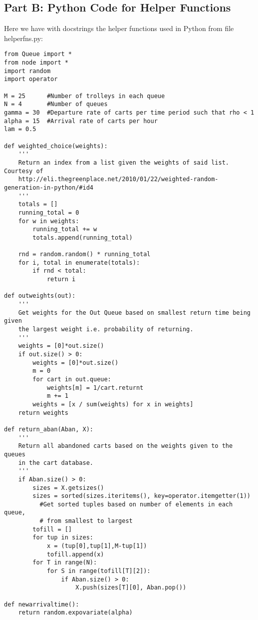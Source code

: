 \documentclass[english]{article}
\begin{document}
\subsection*{Part B: Python Code for Helper Functions}
Here we have with docstrings the helper functions used in Python from file helperfns.py:
\begin{singlespace}
\begin{verbatim}
from Queue import *
from node import *
import random
import operator

M = 25		#Number of trolleys in each queue
N = 4		#Number of queues
gamma = 30 	#Departure rate of carts per time period such that rho < 1
alpha = 15	#Arrival rate of carts per hour
lam = 0.5

def weighted_choice(weights): 
    '''
    Return an index from a list given the weights of said list. Courtesy of     
    http://eli.thegreenplace.net/2010/01/22/weighted-random-generation-in-python/#id4
    '''
    totals = []           
    running_total = 0
    for w in weights:
        running_total += w
        totals.append(running_total)

    rnd = random.random() * running_total
    for i, total in enumerate(totals):
        if rnd < total:
            return i

def outweights(out):
    '''
    Get weights for the Out Queue based on smallest return time being given
    the largest weight i.e. probability of returning.
    '''
    weights = [0]*out.size()
    if out.size() > 0:
        weights = [0]*out.size()
        m = 0
        for cart in out.queue:
            weights[m] = 1/cart.returnt
            m += 1
        weights = [x / sum(weights) for x in weights]
    return weights
    
def return_aban(Aban, X):
    '''
    Return all abandoned carts based on the weights given to the queues 
    in the cart database.
    '''
    if Aban.size() > 0:
        sizes = X.getsizes()
        sizes = sorted(sizes.iteritems(), key=operator.itemgetter(1))
          #Get sorted tuples based on number of elements in each queue,
          # from smallest to largest
        tofill = []
        for tup in sizes:
            x = (tup[0],tup[1],M-tup[1])
            tofill.append(x)
        for T in range(N):
            for S in range(tofill[T][2]):
                if Aban.size() > 0:
                    X.push(sizes[T][0], Aban.pop())
                                       
def newarrivaltime():
    return random.expovariate(alpha)


\end{verbatim}
\end{singlespace}
\end{document}
